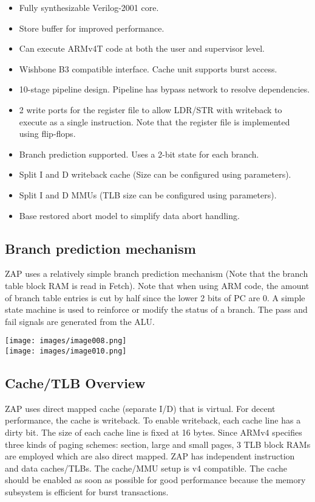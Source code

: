 \documentclass[10pt]{article}
\begin{document}
\begin{itemize}
\item Fully synthesizable Verilog-2001 core.   
\item          Store buffer for improved performance.   
\item          Can execute ARMv4T code at both the user and supervisor level. 
\item          Wishbone B3 compatible interface. Cache unit supports burst access.
\item          10-stage pipeline design. Pipeline has bypass network to resolve 
               dependencies.
\item          2 write ports for the register file to allow LDR/STR with 
               writeback to execute as a single instruction. Note that the 
               register file is implemented using flip-flops.
\item          Branch prediction supported. Uses a 2-bit state for each branch.
\item          Split I and D writeback cache (Size can be configured using parameters).
\item          Split I and D MMUs (TLB size can be configured using parameters).
\item          Base restored abort model to simplify data abort handling.
\end{itemize}

\subsection{Branch prediction mechanism}

ZAP uses a relatively simple branch prediction mechanism (Note that the branch 
table block RAM is read in Fetch). Note that when using ARM code, the amount of 
branch table entries is cut by half since the lower 2 bits of PC are 0. A 
simple state machine is used to reinforce or modify the status of a branch. The 
pass and fail signals are generated from the ALU.

\texttt{[image: images/image008.png]}
\\
\texttt{[image: images/image010.png]}

\subsection{Cache/TLB Overview}

ZAP uses direct mapped cache (separate I/D) that is virtual. For decent 
performance, the cache is writeback. To enable writeback, each cache line has 
a dirty bit. The size of each cache line is fixed at 16 bytes. Since ARMv4 
specifies three kinds of paging schemes: section, large and small pages, 3 
TLB block RAMs are employed which are also direct mapped. ZAP has independent 
instruction and data caches/TLBs. The cache/MMU setup is v4 compatible. The 
cache should be enabled as soon as possible for good performance because the 
memory subsystem is efficient for burst transactions.
\end{document}
